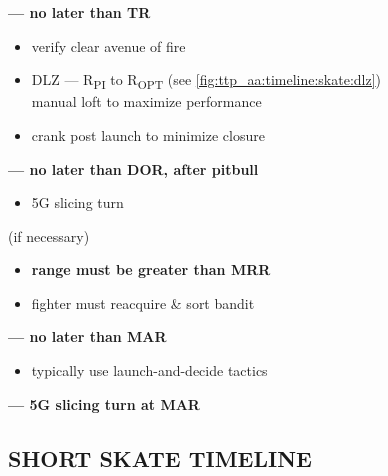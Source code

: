 \begin{checklistenumerate}[start=0]
     \textbf{--- no later than TR}
    \label{subsec:ttp_aa:timeline:skate:shoot}
    \begin{itemize} 
        \item verify clear avenue of fire
        \item DLZ --- R\textsubscript{PI} to R\textsubscript{OPT}
        \hfill (see \cref{fig:ttp_aa:timeline:skate:dlz})\\
        manual loft to maximize performance
        \item crank post launch to minimize closure
    \end{itemize}
    

    \blueitem[Out] \textbf{--- no later than DOR, after pitbull}
    \label{subsec:ttp_aa:timeline:skate:out}
    \begin{itemize}
        \item 5G slicing turn
    \end{itemize}
    \blueitem[Recommit] (if necessary)
    \label{subsec:ttp_aa:timeline:skate:recommit}
    \begin{itemize}
        \item \textbf{range must be greater than MRR}
        \item fighter must reacquire \& sort bandit
    \end{itemize}
     \textbf{--- no later than MAR}
    \begin{itemize}
        \item typically use launch-and-decide tactics
    \end{itemize}
    \label{subsec:ttp_aa:timeline:skate:shoot2}
    \blueitem[Abort]%
    \label{subsec:ttp_aa:timeline:skate:abort}
    \textbf{--- 5G slicing turn at MAR}
\end{checklistenumerate}

\clearpage

\subsection{SHORT SKATE TIMELINE}
\label{subsec:ttp_aa:timeline:shortskate}

